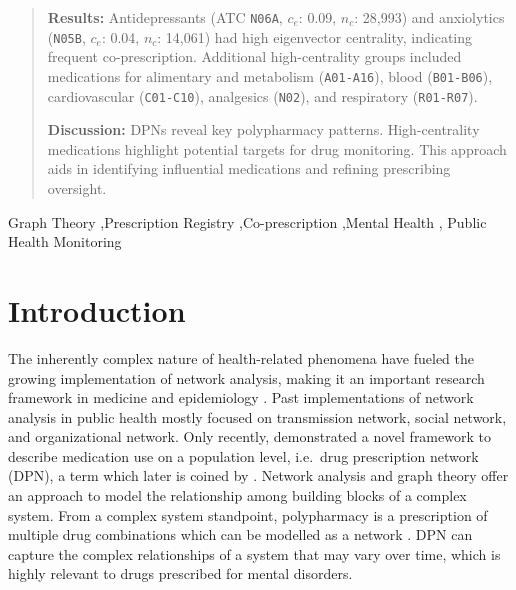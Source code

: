 \documentclass[
  authoryear,
  review]{elsarticle}
\begin{document}
\begin{frontmatter}
\begin{abstract}
\textbf{Results:} Antidepressants (ATC \texttt{N06A}, \(c_e\): 0.09,
\(n_c\): 28,993) and anxiolytics (\texttt{N05B}, \(c_e\): 0.04, \(n_c\):
14,061) had high eigenvector centrality, indicating frequent
co-prescription. Additional high-centrality groups included medications
for alimentary and metabolism (\texttt{A01-A16}), blood
(\texttt{B01-B06}), cardiovascular (\texttt{C01-C10}), analgesics
(\texttt{N02}), and respiratory (\texttt{R01-R07}).

\textbf{Discussion:} DPNs reveal key polypharmacy patterns.
High-centrality medications highlight potential targets for drug
monitoring. This approach aids in identifying influential medications
and refining prescribing oversight.
\end{abstract}





\begin{keyword}
    Graph Theory \sep Prescription
Registry \sep Co-prescription \sep Mental Health \sep 
    Public Health Monitoring
\end{keyword}
\end{frontmatter}
    

\section{Introduction}\label{introduction}

The inherently complex nature of health-related phenomena have fueled
the growing implementation of network analysis, making it an important
research framework in medicine and epidemiology \citep{Luke2007}. Past
implementations of network analysis in public health mostly focused on
transmission network, social network, and organizational network. Only
recently, \citet{Cavallo2012} demonstrated a novel framework to describe
medication use on a population level, i.e.~drug prescription network
(DPN), a term which later is coined by \citet{Bazzoni2015}. Network
analysis and graph theory offer an approach to model the relationship
among building blocks of a complex system. From a complex system
standpoint, polypharmacy is a prescription of multiple drug combinations
which can be modelled as a network \citep{Miglio2021}. DPN can capture
the complex relationships of a system that may vary over time, which is
highly relevant to drugs prescribed for mental disorders.
\end{document}
